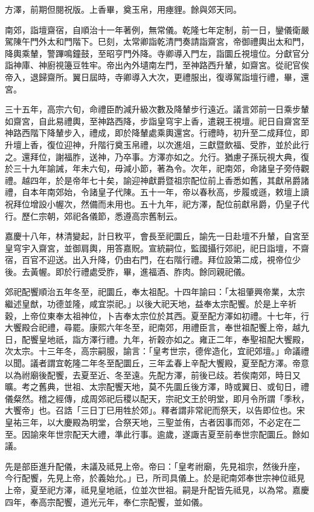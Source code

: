 \begin{pinyinscope}
方澤，前期但閱祝版。上香畢，奠玉帛，用瘞貍。餘與郊天同。

南郊，詣壇齋宿，自順治十一年著例，無常儀。乾隆七年定制，前一日，鑾儀衛嚴駕陳午門外太和門階下。巳刻，太常卿詣乾清門奏請詣齋宮，帝御禮輿出太和門，降輿乘輦，警蹕鳴鐘鼓，至昭亨門外降。寺卿導入門左，詣圜丘視壇位。分獻官分詣神庫、神廚視籩豆牲牢。帝出內外壝南左門，至神路西升輦，如齋宮。從祀官俟帝入，退歸齋所。翼日屆時，寺卿導入大次，更禮服出，復導駕詣壇行禮，畢，還宮。

三十五年，高宗六旬，命禮臣酌減升級次數及降輦步行遠近。議言郊前一日乘步輦如齋宮，自此易禮輿，至神路西降，步詣皇穹宇上香，遣親王視壇。祀日自齋宮至神路西階下降輦步入，禮成，即於降輦處乘輿還宮。行禮時，初升至二成拜位，即升壇上香，復位迎神，升階行奠玉帛禮，以次進俎，三獻暨飲福、受胙，並於此行之。還拜位，謝福胙，送神，乃卒事。方澤亦如之。允行。猶慮子孫玩視大典，復於三十九年諭誡，年未六旬，毋減小節，著為令。次年，祀南郊，命諸皇子旁侍觀禮。越四年，於是帝年七十矣，諭迎神獻爵暨祖宗配位前上香悉如舊，其獻帛爵諸禮，自本年南郊始，令諸皇子代陳。五十一年，帝以春秋高，步履或遜，敕壇上讀祝拜位增設小幄次，然備而未用也。五十九年，祀方澤，配位前獻帛爵，仍皇子代行。歷仁宗朝，郊祀各儀節，悉遵高宗舊制云。

嘉慶十八年，林清變起，計日敉平，會長至祀圜丘，諭先一日赴壇不升輦，自宮至皇穹宇入齋宮，並御肩輿，用答嘉貺。宣統嗣位，監國攝行郊祀，祀日詣壇，不齋宿，百官不迎送。出入升降，仍由右門，在右階行禮。拜位設第二成，視帝位少後。去黃幄。即於行禮處受胙，畢，進福酒、胙肉。餘同親祀儀。

郊祀配饗順治五年冬至，祀圜丘，奉太祖配。十四年諭曰：「太祖肇興帝業，太宗繼述皇猷，功德並隆，咸宜崇祀。」以後大祀天地，益奉太宗配饗。於是上辛祈穀，上帝位東奉太祖神位，卜吉奉太宗位於其西。夏至配方澤如初禮。十七年，行大饗殿合祀禮，尋罷。康熙六年冬至，祀南郊，用禮臣言，奉世祖配饗上帝，越九日，配饗皇地祇，詣方澤行禮。九年，祈穀亦如之。雍正二年，奉聖祖配大饗殿，次太宗。十三年冬，高宗嗣服，諭言：「皇考世宗，德侔造化，宜祀郊壇。」命議禮以聞。議者謂宜乾隆二年冬至配圜丘，三年孟春上辛配大饗殿，夏至配方澤。帝意以為祔廟後配饗，去夏至近、冬至遠。先配方澤，前後已歧。若俟南郊，時日又曠。考之舊典，世祖、太宗配饗天地，莫不先圜丘後方澤，時或翼日、或旬日，禮儀粲然。稽之經傳，成周郊祀后稷以配天，宗祀文王於明堂，即月令所謂「季秋，大饗帝」也。召誥「三日丁巳用牲於郊」。釋者謂非常祀而祭天，以告即位也。宋皇祐三年，以大慶殿為明堂，合祭天地，三聖並侑，古者因事而郊，不必定在二至。因諭來年世宗配天大禮，準此行事。逾歲，遂諏吉夏至前奉世宗配圜丘。餘如議。

先是部臣進升配儀，未議及祗見上帝。帝曰：「皇考祔廟，先見祖宗，然後升座，今行配饗，先見上帝，於義始允。」已，所司具儀上。於是祀南郊奉世宗神位祗見上帝，夏至祀方澤，祗見皇地祇，位並次世祖。嗣是升配皆先祗見，以為常。嘉慶四年，奉高宗配饗，道光元年，奉仁宗配饗，並如儀。


\end{pinyinscope}

